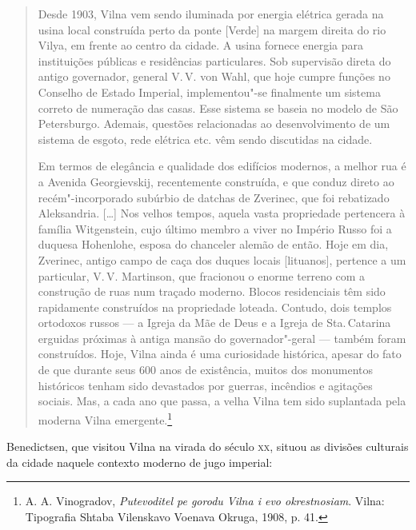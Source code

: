 \begin{quote}
Desde 1903, Vilna vem sendo iluminada por energia elétrica gerada na
usina local construída perto da ponte {[}Verde{]} na margem direita do
rio Vilya, em frente ao centro da cidade. A usina fornece energia para
instituições públicas e residências particulares. Sob supervisão direta
do antigo governador, general V.\,V. von Wahl, que hoje cumpre funções no
Conselho de Estado Imperial, implementou"-se finalmente um sistema
correto de numeração das casas. Esse sistema se baseia no modelo de São
Petersburgo. Ademais, questões relacionadas ao desenvolvimento de um
sistema de esgoto, rede elétrica etc. vêm sendo discutidas na cidade.

Em termos de elegância e qualidade dos edifícios modernos, a melhor rua
é a Avenida Georgievskij, recentemente construída, e que conduz direto
ao recém"-incorporado subúrbio de datchas de Zverinec, que foi rebatizado
Aleksandria. [\ldots{}] Nos velhos tempos, aquela vasta propriedade
pertencera à família Witgenstein, cujo último membro a viver no Império
Russo foi a duquesa Hohenlohe, esposa do chanceler alemão de então. Hoje
em dia, Zverinec, antigo campo de caça dos duques locais {[}lituanos{]},
pertence a um particular, V.\,V. Martinson, que fracionou o enorme
terreno com a construção de ruas num traçado moderno. Blocos
residenciais têm sido rapidamente construídos na propriedade loteada.
Contudo, dois templos ortodoxos russos --- a Igreja da Mãe de Deus e a
Igreja de Sta.\,Catarina erguidas próximas à antiga mansão do
governador"-geral --- também foram construídos. Hoje, Vilna ainda é uma
curiosidade histórica, apesar do fato de que durante seus 600 anos de
existência, muitos dos monumentos históricos tenham sido devastados por
guerras, incêndios e agitações sociais. Mas, a cada ano que passa, a
velha Vilna tem sido suplantada pela moderna Vilna emergente.\footnote{A. A. Vinogradov, \textit{Putevoditel pe gorodu Vilna i evo okrestnosiam}. Vilna: Tipografia Shtaba Vilenskavo Voenava Okruga, 1908, p. 41.} 
\end{quote}

%

Benedictsen, que visitou Vilna na virada do século \textsc{xx}, situou as
divisões culturais da cidade naquele contexto moderno de jugo imperial:

